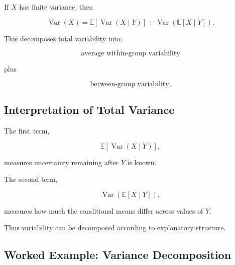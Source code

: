 \begin{theorem}
If \(X\) has finite variance, then

\[
\boxed{
\operatorname{Var}(X)
=
\mathbb{E}
\left[
\operatorname{Var}(X\mid Y)
\right]
+
\operatorname{Var}
\left(
\mathbb{E}[X\mid Y]
\right).
}
\]
\end{theorem}

This decomposes total variability into:

\[
\boxed{
\text{average within-group variability}
}
\]

plus

\[
\boxed{
\text{between-group variability}.
}
\]

\subsection{Interpretation of Total Variance}
\label{subsec:total-variance-interpretation}

The first term,

\[
\mathbb{E}[\operatorname{Var}(X\mid Y)],
\]

measures uncertainty remaining after \(Y\) is known.

The second term,

\[
\operatorname{Var}(\mathbb{E}[X\mid Y]),
\]

measures how much the conditional means differ across values of \(Y\).

Thus variability can be decomposed according to explanatory structure.

\subsection{Worked Example: Variance Decomposition}
\label{subsec:worked-total-variance}

